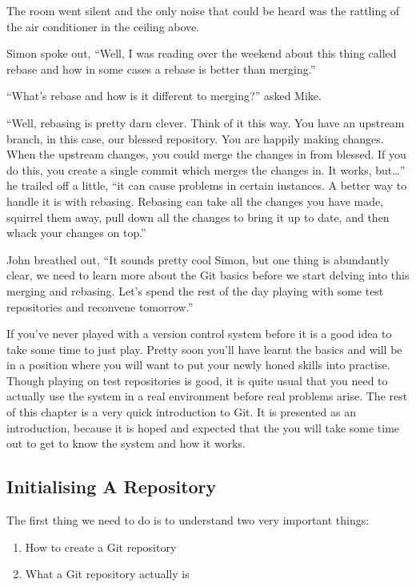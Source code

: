 \begin{trenches}
The room went silent and the only noise that could be heard was the rattling of the air conditioner in the ceiling above. 

Simon spoke out, ``Well, I was reading over the weekend about this thing called rebase and how in some cases a rebase is better than merging.''

``What's rebase and how is it different to merging?'' asked Mike. 

``Well, rebasing is pretty darn clever.  Think of it this way.  You have an upstream branch, in this case, our blessed repository.  You are happily making changes.  When the upstream changes, you could merge the changes in from blessed.  If you do this, you create a single commit which merges the changes in.  It works, but\ldots'' he trailed off a little, ``it can cause problems in certain instances.  A better way to handle it is with rebasing.  Rebasing can take all the changes you have made, squirrel them away, pull down all the changes to bring it up to date, and then whack your changes on top.''

John breathed out, ``It sounds pretty cool Simon, but one thing is abundantly clear, we need to learn more about the Git basics before we start delving into this merging and rebasing.  Let's spend the rest of the day playing with some test repositories and reconvene tomorrow.''
\end{trenches}

If you've never played with a version control system before it is a good idea to take some time to just play.  Pretty soon you'll have learnt the basics and will be in a position where you will want to put your newly honed skills into practise.  Though playing on test repositories is good, it is quite usual that you need to actually use the system in a real environment before real problems arise.  The rest of this chapter is a very quick introduction to Git.  It is presented as an introduction, because it is hoped and expected that the you will take some time out to get to know the system and how it works. 

\subsection{Initialising A Repository}
The first thing we need to do is to understand two very important things: 

\begin{enumerate}
  \item How to create a Git repository 
  \item What a Git repository actually is 
\end{enumerate}

